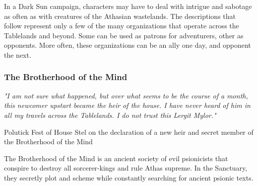 \begin{multicols}{2}

In a Dark Sun campaign, characters may have to deal
with intrigue and sabotage as often as with creatures of
the Athasian wastelands. The descriptions that follow
represent only a few of the many organizations that
operate across the Tablelands and beyond. Some can be
used as patrons for adventurers, other as opponents.
More often, these organizations can be an ally one day,
and opponent the next.

\subsubsection{The Brotherhood of the Mind}
\epigraph{\textit{
"I am not sure what happened, but over what seems to be
the course of a month, this newcomer upstart became the
heir of the house. I have never heard of him in all my
travels across the Tablelands. I do not trust this Lergit
Mylor." }}
{ Polutick Fest of House Stel on the declaration of a
  new heir and secret member of the Brotherhood of the Mind }

The Brotherhood of the Mind is an ancient society of
evil psionicists that conspire to destroy all sorcerer‐kings
and rule Athas supreme. In the Sanctuary, they secretly
plot and scheme while constantly searching for ancient
psionic texts.


\end{multicols}
